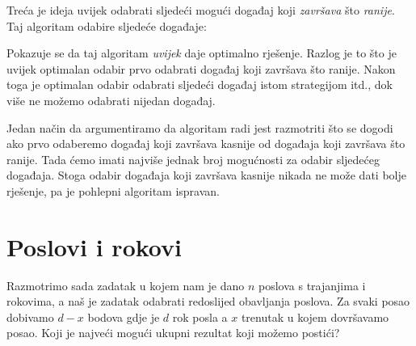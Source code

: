 Treća je ideja uvijek odabrati sljedeći
mogući događaj koji \emph{završava} što \emph{ranije}.
Taj algoritam odabire sljedeće događaje: 
\begin{center}
\end{center}

Pokazuje se da taj algoritam
\emph{uvijek} daje optimalno rješenje.
Razlog je to što je uvijek optimalan odabir
prvo odabrati događaj koji završava
što ranije.
Nakon toga je optimalan odabir
odabrati sljedeći događaj
istom strategijom itd.,
dok više ne možemo odabrati nijedan događaj.

Jedan način da argumentiramo da algoritam radi
jest razmotriti
što se dogodi ako prvo odaberemo događaj
koji završava kasnije od događaja koji završava
što ranije.
Tada ćemo imati najviše jednak broj
mogućnosti za odabir sljedećeg događaja.
Stoga odabir događaja koji završava kasnije
nikada ne može dati bolje rješenje,
pa je pohlepni algoritam ispravan.

\section{Poslovi i rokovi}

Razmotrimo sada zadatak u kojem
nam je dano $n$ poslova s trajanjima i rokovima,
a naš je zadatak odabrati redoslijed obavljanja poslova.
Za svaki posao dobivamo $d-x$ bodova
gdje je $d$ rok posla
a $x$ trenutak u kojem dovršavamo posao.
Koji je najveći mogući ukupni rezultat
koji možemo postići?


